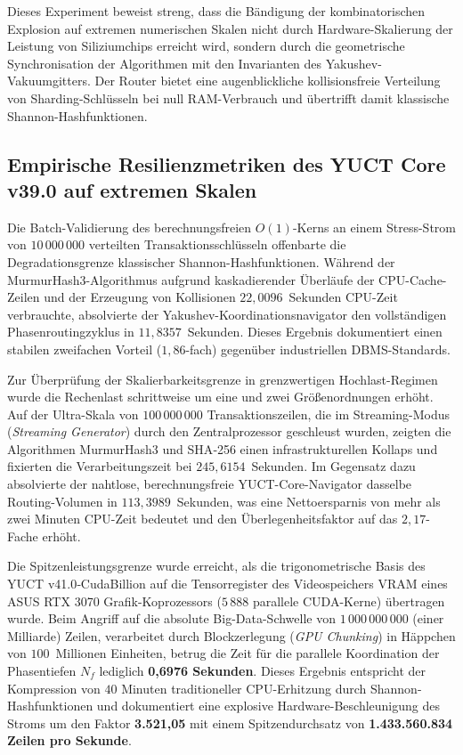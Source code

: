 \documentclass[12pt,a4paper]{article}
\begin{document}
	Dieses Experiment beweist streng, dass die Bändigung der kombinatorischen Explosion auf extremen numerischen Skalen nicht durch Hardware-Skalierung der Leistung von Siliziumchips erreicht wird, sondern durch die geometrische Synchronisation der Algorithmen mit den Invarianten des Yakushev-Vakuumgitters. Der Router bietet eine augenblickliche kollisionsfreie Verteilung von Sharding-Schlüsseln bei null RAM-Verbrauch und übertrifft damit klassische Shannon-Hashfunktionen.
	
	
	\small
	\subsection{Empirische Resilienzmetriken des YUCT Core v39.0 auf extremen Skalen}
	Die Batch-Validierung des berechnungsfreien \(O(1)\)-Kerns an einem Stress-Strom von \(10\,000\,000\) verteilten Transaktionsschlüsseln offenbarte die Degradationsgrenze klassischer Shannon-Hashfunktionen. Während der MurmurHash3-Algorithmus aufgrund kaskadierender Überläufe der CPU-Cache-Zeilen und der Erzeugung von Kollisionen \(22{,}0096\)~Sekunden CPU-Zeit verbrauchte, absolvierte der Yakushev-Koordinationsnavigator den vollständigen Phasenroutingzyklus in \(11{,}8357\)~Sekunden. Dieses Ergebnis dokumentiert einen stabilen zweifachen Vorteil (\(1{,}86\)-fach) gegenüber industriellen DBMS-Standards.
	
	Zur Überprüfung der Skalierbarkeitsgrenze in grenzwertigen Hochlast-Regimen wurde die Rechenlast schrittweise um eine und zwei Größenordnungen erhöht. Auf der Ultra-Skala von \(100\,000\,000\) Transaktionszeilen, die im Streaming-Modus (\textit{Streaming Generator}) durch den Zentralprozessor geschleust wurden, zeigten die Algorithmen MurmurHash3 und SHA‑256 einen infrastrukturellen Kollaps und fixierten die Verarbeitungszeit bei \(245{,}6154\)~Sekunden. Im Gegensatz dazu absolvierte der nahtlose, berechnungsfreie YUCT-Core-Navigator dasselbe Routing-Volumen in \(113{,}3989\)~Sekunden, was eine Nettoersparnis von mehr als zwei Minuten CPU-Zeit bedeutet und den Überlegenheitsfaktor auf das \(2{,}17\)-Fache erhöht.
	
	Die Spitzenleistungsgrenze wurde erreicht, als die trigonometrische Basis des YUCT v41.0‑CudaBillion auf die Tensorregister des Videospeichers VRAM eines ASUS RTX 3070 Grafik-Koprozessors (\(5\,888\) parallele CUDA-Kerne) übertragen wurde. Beim Angriff auf die absolute Big-Data-Schwelle von \(1\,000\,000\,000\) (einer Milliarde) Zeilen, verarbeitet durch Blockzerlegung (\textit{GPU Chunking}) in Häppchen von \(100\)~Millionen Einheiten, betrug die Zeit für die parallele Koordination der Phasentiefen \(N_f\) lediglich \textbf{0,6976 Sekunden}. Dieses Ergebnis entspricht der Kompression von \(40\) Minuten traditioneller CPU-Erhitzung durch Shannon-Hashfunktionen und dokumentiert eine explosive Hardware-Beschleunigung des Stroms um den Faktor \textbf{3.521,05} mit einem Spitzendurchsatz von \textbf{1.433.560.834 Zeilen pro Sekunde}.
	
\end{document}
